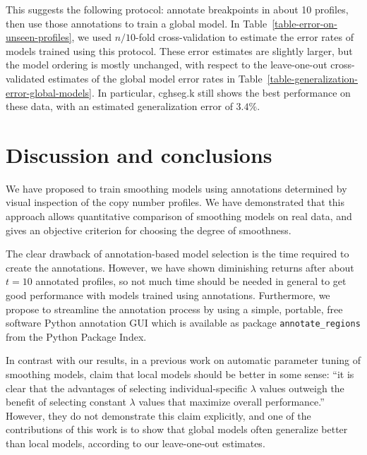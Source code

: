 \documentclass{bioinfo}
\begin{document}
This suggests the following protocol: annotate breakpoints in about 10
profiles, then use those annotations to train a global model. In
Table~\ref{table-error-on-unseen-profiles}, we used $n/10$-fold
cross-validation to estimate the error rates of models trained using
this protocol. These error estimates are slightly larger, but the
model ordering is mostly unchanged, with respect to the leave-one-out
cross-validated estimates of the global model error rates in
Table~\ref{table-generalization-error-global-models}.  In particular,
cghseg.k still shows the best performance on these data, with an
estimated generalization error of $ 3.4\%$. 



\section{Discussion and conclusions}

We have proposed to train smoothing models using annotations
determined by visual inspection of the copy number profiles. We have
demonstrated that this approach allows quantitative comparison of
smoothing models on real data, and gives an objective criterion for
choosing the degree of smoothness.

The clear drawback of annotation-based model selection is the time
required to create the annotations. 
However, 
we have shown diminishing returns
after about $t=10$ annotated profiles, so not much time should be
needed in general to get good performance with models trained using
annotations. Furthermore, we propose to streamline the annotation
process by using a simple, portable, free software Python annotation
GUI which is available as package \texttt{annotate\_regions} from the
Python Package Index.


In contrast with our results, in a previous work on
automatic parameter tuning of smoothing models, \cite{penalized-cna}
claim that local models should be better in some sense: ``it is clear
that the advantages of selecting individual-specific $\lambda$ values
outweigh the benefit of selecting constant $\lambda$ values that
maximize overall performance.''  However, they do not demonstrate this
claim explicitly, and one of the contributions of this work is to show
that global models often generalize better than local models,
according to our leave-one-out estimates. 
\end{document}
